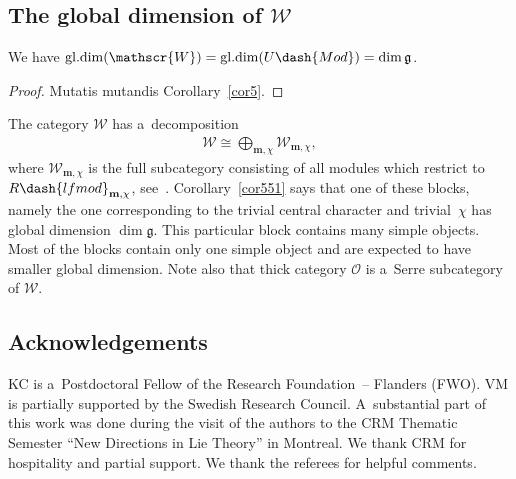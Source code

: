 \documentclass[pdftex]{sigma}
\begin{document}
\subsection[The global dimension of $\mathscr{W}$]{The global dimension of $\boldsymbol{\mathscr{W}}$}%

\begin{corollary}
\label{cor551}
We have $\mathrm{gl.dim}(\mathscr{W})=\mathrm{gl.dim}(U\dash{Mod})=\dim\mathfrak{g}$.
\end{corollary}

\begin{proof}
Mutatis mutandis Corollary~\ref{cor5}.
\end{proof}

\begin{remark}
The category $\mathscr{W}$ has a~decomposition
\begin{gather*}
\mathscr{W}\cong \bigoplus_{\mathbf{m},\chi}\mathscr{W}_{\mathbf{m},\chi},
\end{gather*}
where $\mathscr{W}_{\mathbf{m},\chi}$ is the full subcategory consisting of all modules which restrict to
$R\dash{lfmod}_{\mathbf{m},\chi}$, see~\cite[Theorem~9]{BM}.
Corollary~\ref{cor551} says that one of these blocks, namely the one corresponding to the trivial central character and
trivial~$\chi$ has global dimension $\dim\mathfrak{g}$.
This particular block contains many simple objects.
Most of the blocks contain only one simple object and are expected to have smaller global dimension.
Note also that thick category $\mathcal{O}$ is a~Serre subcategory of $\mathscr{W}$.
\end{remark}

\subsection*{Acknowledgements}
KC is a~Postdoctoral Fellow of the Research Foundation~-- Flanders (FWO).
VM is partially supported by the Swedish Research Council.
A~substantial part of this work was done during the visit of the authors to the CRM Thematic Semester ``New Directions
in Lie Theory'' in Montreal.
We thank CRM for hospitality and partial support.
We thank the referees for helpful comments.
\end{document}
